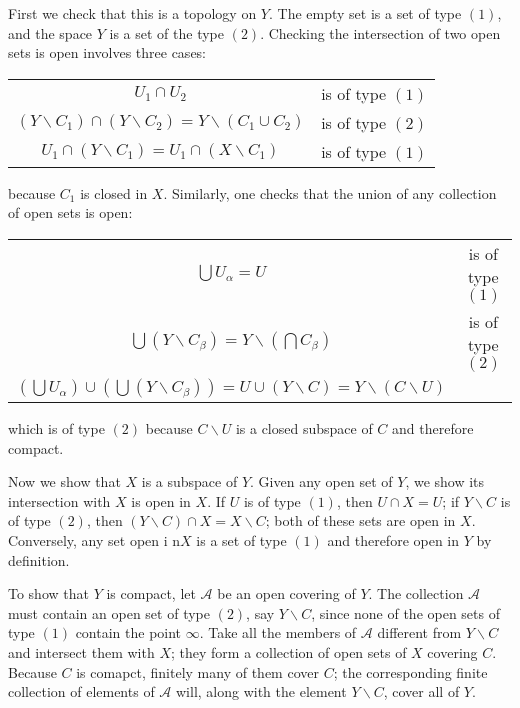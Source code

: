 \documentclass[12pt, a4paper, twoside, openright, titlepage]{book}
\begin{document}
\begin{proof*}{}{}
    First we check that this is a topology on $Y$. The empty set is a set of type $(1)$, and the space $Y$ is a set of the type $(2)$. Checking the intersection of two open sets is open involves three cases: 
    \begin{table}[H]
        \centering
        \begin{tabular}{cc}
            $U_1\cap U_2$ & is of type $(1)$ \\
            $(Y\backslash C_1)\cap (Y\backslash C_2) = Y\backslash (C_1\cup C_2)$ & is of type $(2)$ \\
            $U_1\cap (Y\backslash C_1) = U_1\cap (X\backslash C_1)$ & is of type $(1)$ \\
        \end{tabular}
    \end{table}
    because $C_1$ is closed in $X$. Similarly, one checks that the union of any collection of open sets is open: 
    \begin{table}[H]
        \centering
        \begin{tabular}{cc}
            $\bigcup U_{\alpha} = U$ & is of type $(1)$ \\
            $\bigcup(Y\backslash C_{\beta}) = Y\backslash \left(\bigcap C_{\beta}\right)$ & is of type $(2)$ \\
            $\left(\bigcup U_{\alpha}\right)\cup\left(\bigcup(Y\backslash C_{\beta})\right) = U\cup(Y\backslash C) = Y\backslash(C\backslash U)$ &  \\
        \end{tabular}
    \end{table}
    which is of type $(2)$ because $C\backslash U$ is a closed subspace of $C$ and therefore compact.

    Now we show that $X$ is a subspace of $Y$. Given any open set of $Y$, we show its intersection with $X$ is open in $X$. If $U$ is of type $(1)$, then $U\cap X = U$; if $Y\backslash C$ is of type $(2)$, then $(Y\backslash C)\cap X = X\backslash C$; both of these sets are open in $X$. Conversely, any set open i n$X$ is a set of type $(1)$ and therefore open in $Y$ by definition. 

    To show that $Y$ is compact, let $\mathcal{A}$ be an open covering of $Y$. The collection $\mathcal{A}$ must contain an open set of type $(2)$, say $Y\backslash C$, since none of the open sets of type $(1)$ contain the point $\infty$. Take all the members of $\mathcal{A}$ different from $Y\backslash C$ and intersect them with $X$; they form a collection of open sets of $X$ covering $C$. Because $C$ is comapct, finitely many of them cover $C$; the corresponding finite collection of elements of $\mathcal{A}$ will, along with the element $Y\backslash C$, cover all of $Y$.


\end{proof*}
\end{document}
